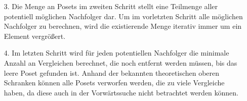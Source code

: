 \documentclass[10pt,journal,compsoc]{IEEEtran}
\begin{document}
\begin{itemize}
\begin{figure}
          \centering
          \caption{Problematischer Fall}
          \label{fig:backward_problematic}
        \end{figure}
        Durch entfernen des Vergleichs vom mittleren zum unteren Element in Poset (1) können sowohl Poset (2), als auch Poset (3) entstehen, wie in Abbildung~\ref{fig:backward_problematic} veranschaulicht. \\
        Um dieses Problem zu lösen, werden alle möglichen Nachfolger berechnet.

  \item[3.]
        Die Menge an Posets im zweiten Schritt stellt eine Teilmenge aller potentiell möglichen Nachfolger dar.
        Um im vorletzten Schritt alle möglichen Nachfolger zu berechnen, wird die existierende Menge iterativ immer um ein Element vergrößert.

  \item[4.]
        Im letzten Schritt wird für jeden potentiellen Nachfolger die minimale Anzahl an Vergleichen berechnet, die noch entfernt werden müssen, bis das leere Poset gefunden ist.
        Anhand der bekannten theoretischen oberen Schranken können alle Posets verworfen werden, die zu viele Vergleiche haben, da diese auch in der Vorwärtssuche nicht betrachtet werden können.
\end{itemize}
\end{document}
